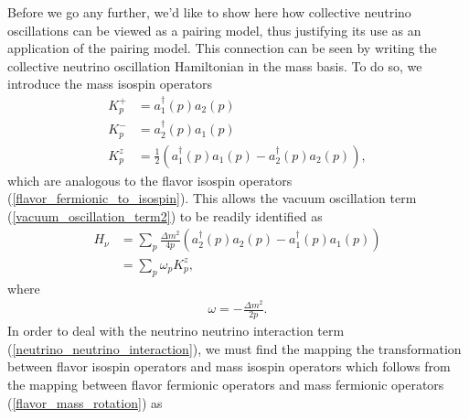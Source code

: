 \documentclass[Dual]{msu-thesis}
\begin{document}
Before we go any further, we'd like to show here how collective neutrino oscillations can be viewed as a pairing model, thus justifying its use as an application of the pairing model. This connection can be seen by writing the collective neutrino oscillation Hamiltonian in the mass basis. To do so, we introduce the
mass isospin operators
\begin{align}
K^+_p&=a^\dagger_1(p)a_2(p)
\\
K^-_p&=a^\dagger_2(p)a_1(p)
\\
K^z_p&=\frac{1}{2}\left(a^\dagger_1(p)a_1(p)-a^\dagger_2(p)a_2(p)\right)
,\end{align}
which are analogous to the flavor isospin operators (\ref{flavor_fermionic_to_isospin}). This allows the vacuum oscillation term (\ref{vacuum_oscillation_term2}) to be readily identified as
\begin{align}
\label{vacuum_oscillation_term_k}
H_\nu 
&= 
\sum_p\frac{\Delta m^2}{4p}\left(a^\dagger_2(p)a_2(p)-a^\dagger_1(p)a_1(p)\right)
\nonumber
\\
&=
\sum_p\omega_pK^z_p
,\end{align}
where
\begin{align}
\omega=-\frac{\Delta m^2}{2p}
.\end{align}
In order to deal with the neutrino neutrino interaction term (\ref{neutrino_neutrino_interaction}), we must find the mapping the transformation between flavor isospin operators and mass isospin operators which follows from the mapping between flavor fermionic operators and mass fermionic operators (\ref{flavor_mass_rotation}) as
\end{document}
